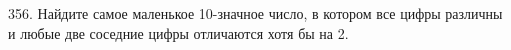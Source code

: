 356. Найдите самое маленькое 10-значное число, в котором все цифры различны и любые две соседние цифры отличаются хотя бы на 2.\\
